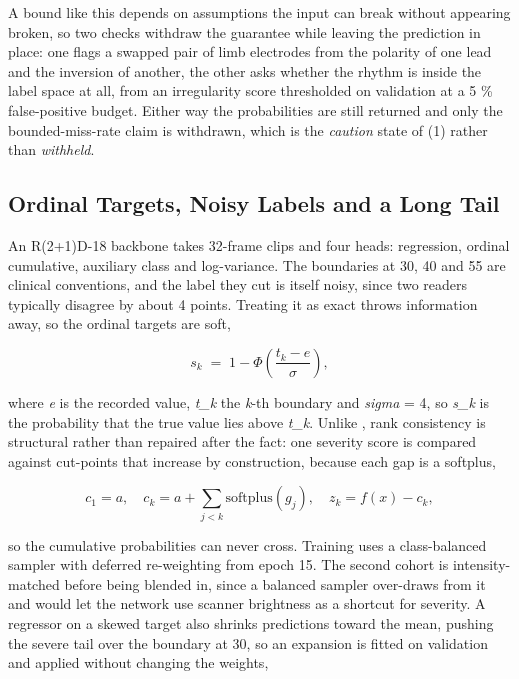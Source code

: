 \documentclass[conference,a4paper]{IEEEtran}
\begin{document}
A bound like this depends on assumptions the input can break without appearing broken, so two checks withdraw the guarantee while leaving the prediction in place: one flags a swapped pair of limb electrodes from the polarity of one lead and the inversion of another, the other asks whether the rhythm is inside the label space at all, from an irregularity score thresholded on validation at a 5 \% false-positive budget. Either way the probabilities are still returned and only the bounded-miss-rate claim is withdrawn, which is the \textit{caution} state of (1) rather than \textit{withheld}.

\subsection{Ordinal Targets, Noisy Labels and a Long Tail}
An R(2+1)D-18 backbone \cite{ref8} takes 32-frame clips and four heads: regression, ordinal cumulative, auxiliary class and log-variance. The boundaries at 30, 40 and 55 are clinical conventions, and the label they cut is itself noisy, since two readers typically disagree by about 4 points. Treating it as exact throws information away, so the ordinal targets are soft,

\begin{equation}
s_k \;=\; 1 - \Phi\!\left(\frac{t_k - e}{\sigma}\right),
\end{equation}

where \textit{e} is the recorded value, \textit{t\_k} the \textit{k}-th boundary and \textit{sigma} = 4, so \textit{s\_k} is the probability that the true value lies above \textit{t\_k}. Unlike \cite{ref23}, rank consistency is structural rather than repaired after the fact: one severity score is compared against cut-points that increase by construction, because each gap is a softplus,

\begin{equation}
c_1 = a,\quad c_k = a + \sum_{j<k}\mathrm{softplus}(g_j),\quad z_k = f(x) - c_k,
\end{equation}

so the cumulative probabilities can never cross. Training uses a class-balanced sampler with deferred re-weighting \cite{ref24} from epoch 15. The second cohort is intensity-matched before being blended in, since a balanced sampler over-draws from it and would let the network use scanner brightness as a shortcut for severity. A regressor on a skewed target also shrinks predictions toward the mean, pushing the severe tail over the boundary at 30, so an expansion is fitted on validation and applied without changing the weights,
\end{document}
